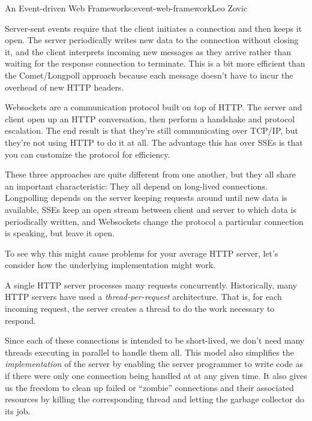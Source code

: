 \begin{aosachapter}{An Event-driven Web Framework}{s:event-web-framework}{Leo Zovic}
\label{server-sent-events-sse}

Server-sent events require that the client initiates a connection and
then keeps it open. The server periodically writes new data to the
connection without closing it, and the client interprets incoming new
messages as they arrive rather than waiting for the response connection
to terminate. This is a bit more efficient than the Comet/Longpoll
approach because each message doesn't have to incur the overhead of new
HTTP headers.

\label{websockets}

Websockets are a communication protocol built on top of HTTP. The server
and client open up an HTTP conversation, then perform a handshake and
protocol escalation. The end result is that they're still communicating
over TCP/IP, but they're not using HTTP to do it at all. The advantage
this has over SSEs is that you can customize the protocol for
efficiency.

\label{long-lived-connections}

These three approaches are quite different from one another, but they
all share an important characteristic: They all depend on long-lived
connections. Longpolling depends on the server keeping requests around
until new data is available, SSEs keep an open stream between client and
server to which data is periodically written, and Websockets change the
protocol a particular connection is speaking, but leave it open.

To see why this might cause problems for your average HTTP server, let's
consider how the underlying implementation might work.

\label{traditional-http-server-architecture}

\label{sec.eventsweb.serverarch}

A single HTTP server processes many requests concurrently. Historically,
many HTTP servers have used a \emph{thread-per-request} architecture.
That is, for each incoming request, the server creates a thread to do
the work necessary to respond.

Since each of these connections is intended to be short-lived, we don't
need many threads executing in parallel to handle them all. This model
also simplifies the \emph{implementation} of the server by enabling the
server programmer to write code as if there were only one connection
being handled at at any given time. It also gives us the freedom to
clean up failed or ``zombie'' connections and their associated resources
by killing the corresponding thread and letting the garbage collector do
its job.


\end{aosachapter}
